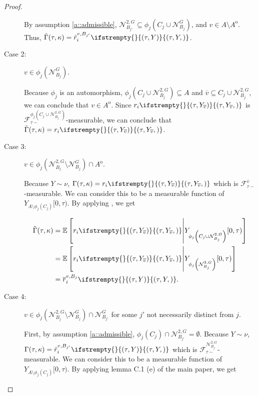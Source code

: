 \documentclass[12pt]{article}
\newcommand{\mb}{\mathbb}
\newcommand{\mc}{\mathcal}
\newcommand{\ov}{\overline}
\newcommand{\ex}[1]{\mb{E}\left[#1\right]}			%
\newcommand{\gneigh}[2]{\mc{N}^{#1}_{#2}}			%
\newcommand{\dgneigh}[2]{\mc{N}^{2,#1}_{#2}}		%
\newcommand{\cl}[1]{\ov{#1}}						%
\newcommand{\rate}{r}								%
\newcommand{\F}{\mc{F}}								%
\newcommand{\vind}[1]{_{#1}}						%
\newcommand{\tmi}[1]{#1}							%
\newcommand{\vpara}[1]{^{#1}}						%
\newcommand{\stpara}[1]{_{#1}}						%
\newcommand{\tpara}[1]{_{#1}}						%
\newcommand{\tmepro}[3]{
\ifstrempty{#3}{
	\left(#1,#2\right)}{
	\left(#1,#2,#3\right)}}							%
\newcommand{\Xg}{Y}									%
\newcommand{\brate}{\alt{\rate}}					%
\newcommand{\inte}[1]{{#1}^\mathrm{o}}				%
\newcommand{\alt}[1]{\tilde{#1}}					%
\newcommand{\rt}{\tau}								%
\renewcommand{\mark}{\kappa}						%
\newcommand{\ratee}{\Gamma}							%
\newcommand{\cratee}{\alt{\ratee}}					%
\newcommand{\mm}{\nu}								%
\newcommand{\bgrate}{\ov{\rate}}					%
\newcommand{\vjpara}[2]{^{#1,#2}}					%
\begin{document}
\begin{proof}
\begin{description}
By assumption \ref{a::admissible}, \(\dgneigh{G}{B_{j'}} \subseteq \phi_j(C_j\cup \gneigh{G}{B_j})\), and \(v \in A\setminus\inte{A}\). Thus, \(\cratee(\rt,\mark) = \brate\vjpara{v}{B_{j'}}\stpara{i}\tmepro{\rt}{\Xg}{}\).

\item[Case 2: ] \(v\in \phi_j(\gneigh{G}{B_j})\). 

Because \(\phi_j\) is an automorphism, \(\phi_j\left(C_j\cup\dgneigh{G}{B_j}\right) \subseteq A\) and \(\cl{v} \subseteq C_j\cup\dgneigh{G}{B_j}\), we can conclude that \(v \in \inte{A}\). Since \(\rate\stpara{i}\tmepro{\rt}{\Xg\vind{\cl{v}}}{}\) is \(\F\vpara{\phi_j\left(C_j\cup\dgneigh{G}{B_j}\right)}\tpara{\rt-}\)-measurable, we can conclude that \(\cratee(\rt,\mark) = \rate\stpara{i}\tmepro{\rt}{\Xg\vind{\cl{v}}}{}\).

\item[Case 3: ] \(v \in \phi_j(\dgneigh{G}{B_j}\setminus\gneigh{G}{B_j})\cap\inte{A}\).

Because \(\Xg\sim\mm\), \(\ratee(\rt,\mark) = \rate\stpara{i}\tmepro{\rt}{\Xg\vind{\cl{v}}}{}\) which is \(\F\vpara{\cl{v}}\tpara{\rt-}\)-measurable. We can consider this to be a measurable function of \(\Xg\vind{A\setminus\phi_j(C_j)}\tmi{[0,\rt)}\). By applying \cite[lemma \ref{F-TL::Props}(e)]{F}, we get

\begin{align*}
\cratee(\rt,\mark) &= \ex{\rate\stpara{i}\tmepro{\rt}{\Xg\vind{\cl{v}}}{}\middle|\Xg\vind{\phi_j\left(C_j\cup\dgneigh{G}{B_j}\right)}\tmi{[0,\rt)}}\\
&= \ex{\rate\stpara{i}\tmepro{\rt}{\Xg\vind{\cl{v}}}{}\middle|\Xg\vind{\phi_j\left(\dgneigh{G}{B_j}\right)}\tmi{[0,\rt)}}\\
&= \bgrate\vjpara{v}{B_j}\stpara{i}\tmepro{\rt}{\Xg}{}.
\end{align*}

\item[Case 4: ] \(v \in \phi_j(\dgneigh{G}{B_j}\setminus\gneigh{G}{B_j})\cap \gneigh{G}{B_{j'}}\) for some \(j'\) not necessarily distinct from \(j\).

First, by assumption \ref{a::admissible}, \(\phi_j(C_j)\cap\dgneigh{G}{B_{j'}}= \emptyset\). Because \(\Xg\sim\mm\), \(\ratee(\rt,\mark) = \brate\vjpara{v}{B_{j'}}\stpara{i}\tmepro{\rt}{\Xg}{}\) which is \(\F\vpara{\dgneigh{G}{B_{j'}}}\tpara{\rt-}\)-measurable. We can consider this to be a measurable function of \(\Xg\vind{A\setminus\phi_j(C_j)}\tmi{[0,\rt)}\). By applying lemma C.1 (e) of the main paper, we get


\end{description}
\end{proof}
\end{document}
